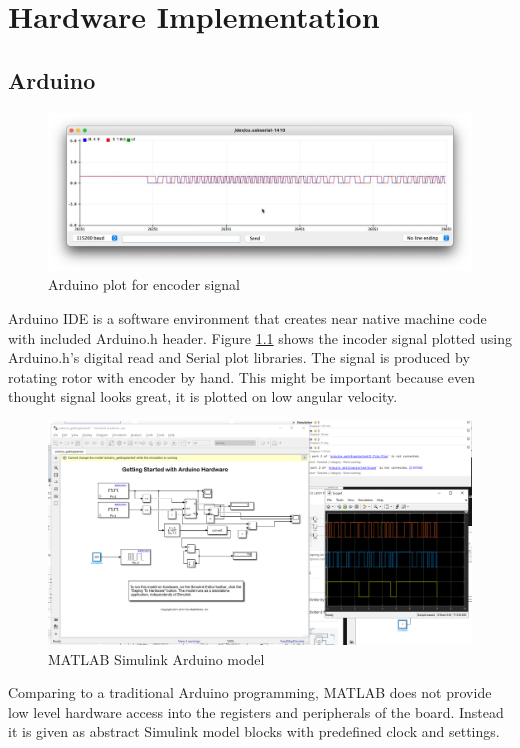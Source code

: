 \documentclass[]{final_report}
\begin{document}
\chapter{Hardware Implementation}

\section{Arduino}

\begin{figure} [h!]
\centerline{\includegraphics[width=.75\textwidth]{Screenshots for paper/arduino/encoder signal.jpeg}}
\caption{Arduino plot for encoder signal}
\label{fig:arduinoEncoder}
\end{figure}

Arduino IDE is a software environment that creates near native machine code with included Arduino.h header. Figure \ref{fig:arduinoEncoder} shows the incoder signal plotted using Arduino.h's digital read and Serial plot libraries. The signal is produced by rotating rotor with encoder by hand. This might be important because even thought signal looks great, it is plotted on low angular velocity.

\begin{figure} [h!]
\centerline{\includegraphics[width=.75\textwidth]{Screenshots for paper/arduino/Model encoder arduin MATLAB.PNG}}
\caption{MATLAB Simulink Arduino model}
\label{fig:arduinoSimulink}
\end{figure}

Comparing to a traditional Arduino programming, MATLAB does not provide low level hardware access into the registers and peripherals of the board. Instead it is given as abstract Simulink model blocks with predefined clock and settings.
\end{document}
